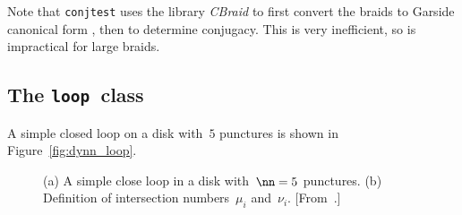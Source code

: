 \documentclass[12pt]{article}
\newcommand{\loopc}{\texttt{loop}}%
\begin{document}
Note that \lstinline{conjtest} uses the library \emph{CBraid}
\citep{CBraid} to first convert the braids to Garside canonical
form \citep{Birman2005}, then to determine conjugacy.  This is very
inefficient, so is impractical for large braids.


\subsection{The \loopc\ class}
\label{sec:loop}

A simple closed loop on a disk with~$5$ punctures is shown in
Figure~\ref{fig:dynn_loop}.
%
\begin{figure}
\begin{center}
\hspace{1em}
\end{center}
\caption{(a) A simple close loop in a disk with~$\nn=5$ punctures.
  (b) Definition of intersection numbers~$\mu_i$ and~$\nu_i$.
  [From~\citet{Thiffeault2010}.]}
\end{figure}
\end{document}
